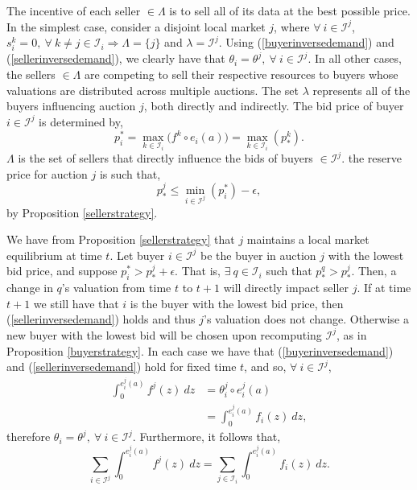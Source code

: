 \documentclass[12pt]{article}
\theoremstyle{definition}
\newcommand{\mcI}{\mathcal{I}}
\begin{document}
\begin{multicols}{2}
The incentive of each seller $\in\Lambda$ is to sell all of its data at the
best possible price. In the simplest case,
consider a disjoint local market $j$, where $\forall \ i\in\mcI^j$, $s_i^k = 0,
\ \forall \ k\ne j \in \mcI_i \Rightarrow \Lambda = \lbrace j \rbrace$ and
$\lambda = \mcI^j$. 
Using (\ref{buyerinversedemand}) and  (\ref{sellerinversedemand}), we clearly
have that $\theta_i = \theta^j, \ \forall \ i \in \mcI^j$.
In all other cases, the sellers $\in\Lambda$ are competing to sell
their respective resources to buyers whose valuations are distributed across multiple auctions. 
The set $\lambda$ represents all of the buyers influencing auction $j$, both
directly and indirectly. 
The bid price of buyer $i\in\mcI^j$ is determined by,
\begin{equation}\label{maxbid}
    p_i^* = \max_{k\in\mcI_i}\big(f^k \circ e_i(a)\big)= \max_{k\in\mcI_i}(p_*^k).
\end{equation}
$\Lambda$ is the set of sellers that directly influence the bids of buyers
$\in\mcI^j$. the reserve price for auction $j$ is such that,
\begin{equation}\label{resprice}
    p_*^j \le \min_{i\in\mcI^j}(p_i^*) - \epsilon,
\end{equation}
by Proposition \ref{sellerstrategy}. 

We have from Proposition \ref{sellerstrategy} that $j$ maintains a local market
equilibrium at time $t$. Let buyer $i\in\mcI^j$ be the buyer in auction $j$ with the lowest bid price,
and suppose $p_i^* > p_*^j + \epsilon$. That is, $\exists \ q \in \mcI_i$ such
that $p_*^q > p_*^j$. Then, a change in $q$'s valuation from time $t$ to $t+1$ will
directly impact seller $j$. If at time $t+1$ we still have that $i$ is the
buyer with the lowest bid price, then (\ref{sellerinversedemand}) holds and
thus $j$'s valuation does not change. Otherwise a new buyer with the lowest bid will be chosen upon
recomputing $\mcI^j$, as in Proposition \ref{buyerstrategy}. 
In each case we
have that (\ref{buyerinversedemand}) and (\ref{sellerinversedemand}) hold for
fixed time $t$, and so, $\forall \ i \in\mcI^j$,
\begin{align*}
    \int_0^{e_i^j(a)} f^j(z) \ dz &= \theta_i^j \circ e_i^j(a)\\
    &= \int_0^{e_i^j(a)} f_i(z) \ dz,
\end{align*}
therefore $\theta_i = \theta^j, \ \forall \ i \in \mcI^j$.
Furthermore, it follows that,
\begin{equation}\label{jdemand}
    \displaystyle\sum_{i\in\mcI^j}\int_0^{e_i^j(a)} f^j(z) \ dz =
\sum_{j\in\mcI_i}\int_0^{e_i^j(a)} f_i(z) \ dz.
\end{equation}


\end{multicols}
\end{document}
